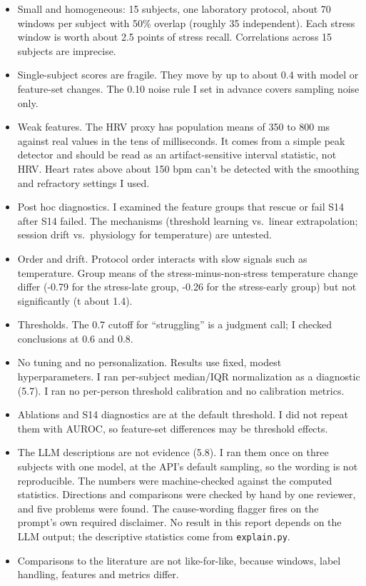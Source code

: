 \documentclass[11pt]{article}
\providecommand{\tightlist}{\setlength{\itemsep}{2pt}\setlength{\parskip}{0pt}}
\begin{document}
\begin{itemize}
\tightlist
\item
  Small and homogeneous: 15 subjects, one laboratory protocol, about 70
  windows per subject with 50\% overlap (roughly 35 independent). Each
  stress window is worth about 2.5 points of stress recall. Correlations
  across 15 subjects are imprecise.
\item
  Single-subject scores are fragile. They move by up to about 0.4 with
  model or feature-set changes. The 0.10 noise rule I set in advance
  covers sampling noise only.
\item
  Weak features. The HRV proxy has population means of 350 to 800 ms
  against real values in the tens of milliseconds. It comes from a
  simple peak detector and should be read as an artifact-sensitive
  interval statistic, not HRV. Heart rates above about 150 bpm can't be
  detected with the smoothing and refractory settings I used.
\item
  Post hoc diagnostics. I examined the feature groups that rescue or
  fail S14 after S14 failed. The mechanisms (threshold learning
  vs.~linear extrapolation; session drift vs.~physiology for
  temperature) are untested.
\item
  Order and drift. Protocol order interacts with slow signals such as
  temperature. Group means of the stress-minus-non-stress temperature
  change differ (-0.79 for the stress-late group, -0.26 for the
  stress-early group) but not significantly (t about 1.4).
\item
  Thresholds. The 0.7 cutoff for ``struggling'' is a judgment call; I
  checked conclusions at 0.6 and 0.8.
\item
  No tuning and no personalization. Results use fixed, modest
  hyperparameters. I ran per-subject median/IQR normalization as a
  diagnostic (5.7). I ran no per-person threshold calibration and no
  calibration metrics.
\item
  Ablations and S14 diagnostics are at the default threshold. I did not
  repeat them with AUROC, so feature-set differences may be threshold
  effects.
\item
  The LLM descriptions are not evidence (5.8). I ran them once on three
  subjects with one model, at the API's default sampling, so the wording
  is not reproducible. The numbers were machine-checked against the
  computed statistics. Directions and comparisons were checked by hand
  by one reviewer, and five problems were found. The cause-wording
  flagger fires on the prompt's own required disclaimer. No result in
  this report depends on the LLM output; the descriptive statistics come
  from \texttt{explain.py}.
\item
  Comparisons to the literature are not like-for-like, because windows,
  label handling, features and metrics differ.
\end{itemize}
\end{document}

